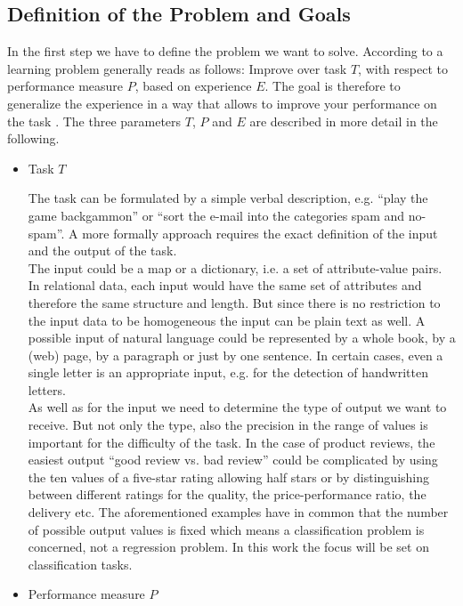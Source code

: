 \documentclass[article,type=msc,colorback,accentcolor=tud7b]{tudthesis}
\begin{document}
  \subsection{Definition of the Problem and Goals}
  \label{subsec:definition_of_the_problem_and_goals}
    In the first step we have to define the problem we want to solve. According to \citeauthor{Mitchell1997} a learning problem generally reads as follows: Improve over task $T$, with respect to performance measure $P$, based on experience $E$. The goal is therefore to generalize the experience in a way that allows to improve your performance on the task \autocite[chapter~1]{Mitchell1997}. The three parameters $T$, $P$ and $E$ are described in more detail in the following.
    \begin{itemize}
      \item Task $T$
      
        The task can be formulated by a simple verbal description, e.g. “play the game backgammon” or “sort the e-mail into the categories spam and no-spam”. A more formally approach requires the exact definition of the input and the output of the task. \\
        The input could be a map or a dictionary, i.e. a set of attribute-value pairs. In relational data, each input would have the same set of attributes and therefore the same structure and length. But since there is no restriction to the input data to be homogeneous the input can be plain text as well. A possible input of natural language could be represented by a whole book, by a (web) page, by a paragraph or just by one sentence. In certain cases, even a single letter is an appropriate input, e.g. for the detection of handwritten letters. \\
        As well as for the input we need to determine the type of output we want to receive. But not only the type, also the precision in the range of values is important for the difficulty of the task. In the case of product reviews, the easiest output “good review vs. bad review” could be complicated by using the ten values of a five-star rating allowing half stars or by distinguishing between different ratings for the quality, the price-performance ratio, the delivery etc. The aforementioned examples have in common that the number of possible output values is fixed which means a classification problem is concerned, not a regression problem. In this work the focus will be set on classification tasks.
      \item Performance measure $P$
      

\end{itemize}
\end{document}
